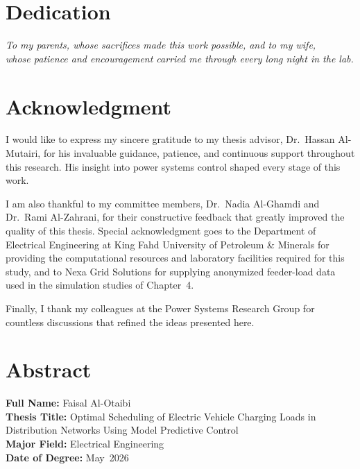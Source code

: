 \documentclass[12pt,twoside]{report}
\newcommand{\ttitle}{Optimal Scheduling of Electric Vehicle Charging Loads in Distribution Networks Using Model Predictive Control}
\newcommand{\tauthor}{Faisal Al-Otaibi}
\newcommand{\tmajor}{Electrical Engineering}
\newcommand{\tmonth}{May}
\newcommand{\tyear}{2026}
\begin{document}
\newpage
{}
\setcounter{page}{3}

\chapter*{Dedication}
\vspace{2cm}
\begin{center}
\textit{To my parents, whose sacrifices made this work possible, and to my wife,\\
whose patience and encouragement carried me through every long night in the lab.}
\end{center}

\chapter*{Acknowledgment}
I would like to express my sincere gratitude to my thesis advisor, Dr.\ Hassan Al-Mutairi, for
his invaluable guidance, patience, and continuous support throughout this research. His insight
into power systems control shaped every stage of this work.

I am also thankful to my committee members, Dr.\ Nadia Al-Ghamdi and Dr.\ Rami Al-Zahrani, for
their constructive feedback that greatly improved the quality of this thesis. Special
acknowledgment goes to the Department of Electrical Engineering at King Fahd University of
Petroleum \& Minerals for providing the computational resources and laboratory facilities
required for this study, and to Nexa Grid Solutions for supplying anonymized feeder-load data
used in the simulation studies of Chapter~4.

Finally, I thank my colleagues at the Power Systems Research Group for countless discussions
that refined the ideas presented here.

\begingroup
\hypersetup{linkcolor=kfupmslate}
\tableofcontents
\newpage
\listoftables
\newpage
\listoffigures
\endgroup

\chapter*{Abstract}
\noindent
\textbf{Full Name:} \tauthor\\
\textbf{Thesis Title:} \ttitle\\
\textbf{Major Field:} \tmajor\\
\textbf{Date of Degree:} \tmonth\ \tyear
\end{document}
